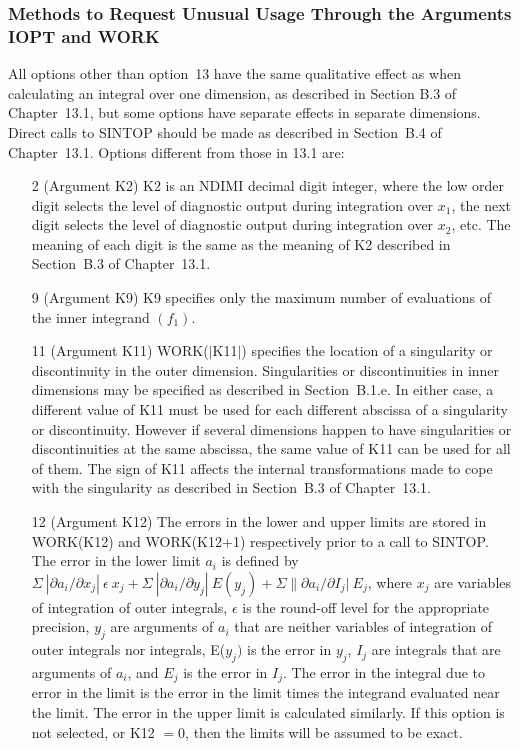 \documentclass[twoside]{MATH77}
\begin{document}
\subsubsection{Methods to Request Unusual Usage Through the Arguments IOPT
and WORK\label{UnusualUse}}

All options other than option~13 have the same qualitative effect as when
calculating an integral over one dimension, as described in Section B.3
of Chapter~13.1, but some options have separate effects in separate
dimensions.  Direct calls to SINTOP should be made as described in
Section~B.4 of Chapter~13.1. Options different from those in 13.1 are:

\begin{itemize}
\item[2]  (Argument K2) K2 is an NDIMI decimal digit integer, where the
low order digit selects the level of diagnostic output during integration
over $x_1$, the next digit selects the level of diagnostic output during
integration over $x_2$, etc. The meaning of each digit is the same as the
meaning of K2 described in Section~B.3 of Chapter~13.1.

\item[9]  (Argument K9) K9 specifies only the maximum number of evaluations
of the inner integrand $(f_1).$

\item[11] (Argument K11) WORK($|$K11$|$) specifies the location of a
singularity or discontinuity in the outer dimension.  Singularities or
discontinuities in inner dimensions may be specified as described in
Section~B.1.e.  In either case, a different value of K11 must be used for
each different abscissa of a singularity or discontinuity.  However if
several dimensions happen to have singularities or discontinuities at the
same abscissa, the same value of K11 can be used for all of them.  The
sign of K11 affects the internal transformations made to cope with the
singularity as described in Section~B.3 of Chapter~13.1.

\item[12] (Argument K12) The errors in the lower and upper limits are
stored in WORK(K12) and WORK(K12+1) respectively prior to a
call to SINTOP.  The error in the lower limit $a_i$ is defined by $ \Sigma
\ |\partial a_i/\partial x_j|\ \epsilon \ x_j+\Sigma \ |\partial
a_i/\partial y_j|\ E(y_j)+\Sigma \|\partial a_i/\partial I_j|\ E_j$, where
$ x_j$ are variables of integration of outer integrals, $\epsilon $ is the
round-off level for the appropriate precision, $y_j$ are arguments of
$a_i$ that are neither variables of integration of outer integrals nor
integrals, E($y_j)$ is the error in $y_j$, $I_j$ are integrals that are
arguments of $ a_i$, and $E_j$ is the error in $I_j$.  The error in the
integral due to error in the limit is the error in the limit times the
integrand evaluated near the limit.  The error in the upper limit is
calculated similarly.  If this option is not selected, or K12 $=0$, then
the limits will be assumed to be exact.


\end{itemize}
\end{document}
